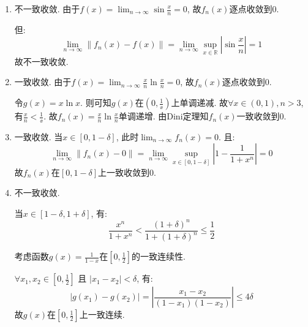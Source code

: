 \begin{solution}
    \begin{enumerate}
        \item 不一致收敛.
            由于\(f(x)=\lim_{n \to \infty} \sin \frac{x}{n} = 0\),
            故\(f_{n}(x)\)逐点收敛到\(0\).

            但:
            \[
                \lim_{n \to \infty} \left\lVert f_{n}(x) - f(x) \right\rVert
                = \lim_{n \to \infty} \sup_{x \in \mathbb{R}} \left\lvert \sin
                \frac{x}{n} \right\rvert
                = 1
            \]
            故不一致收敛.

        \item 一致收敛.
            由于\(f(x)=\lim_{n \to \infty} \frac{x}{n} \ln \frac{x}{n} = 0\),
            故\(f_{n}(x)\)逐点收敛到\(0\).

            令\(g(x)=x \ln x\). 则可知\(g(x)\)在\((0,\frac{1}{\ee})\)上单调递减.
            故\(\forall x \in (0,1), n > 3\), 有\(\frac{x}{n} <
            \frac{1}{\ee}\). 故\(f_{n}(x) = \frac{x}{n} \ln
            \frac{x}{n}\)单调递增. 由Dini定理知\(f_{n}(x)\)一致收敛到\(0\).

        \item 一致收敛.
            当\(x \in [0,1-\delta]\), 此时\(\lim_{n \to \infty}f_{n}(x) = 0\). 且:
            \[
                \lim_{n \to \infty}\left\lVert f_{n}(x) - 0 \right\rVert
                = \lim_{n \to \infty} \sup_{x \in [0,1-\delta]} \left\vert 1 -
                \frac{1}{1+ x^{n}} \right\vert
                = 0
            \]
            故\(f_{n}(x)\)在\([0,1-\delta]\)上一致收敛到\(0\).

        \item 不一致收敛.

            当\(x \in [1-\delta,1+\delta]\), 有:
            \[
                \frac{x^{n}}{1 + x^{n}} < \frac{(1+\delta)^{n}}{1+
                (1+\delta)^{n}} \le \frac{1}{2}
            \]

            考虑函数\(g(x) = \frac{1}{1-x}\)在\([0,\frac{1}{2}]\)的一致连续性.

            \(\forall x_1, x_2 \in [0, \frac{1}{2}]\) 且 \(\left\vert x_1 - x_2
            \right\vert < \delta\), 有:
            \[
                \left\vert g(x_1) - g(x_2) \right\vert
                = \left\vert \frac{x_1 - x_2}{(1-x_1)(1-x_2)} \right\vert
                \le 4 \delta
            \]
            故\(g(x)\)在\([0,\frac{1}{2}]\)上一致连续.


\end{enumerate}
\end{solution}
